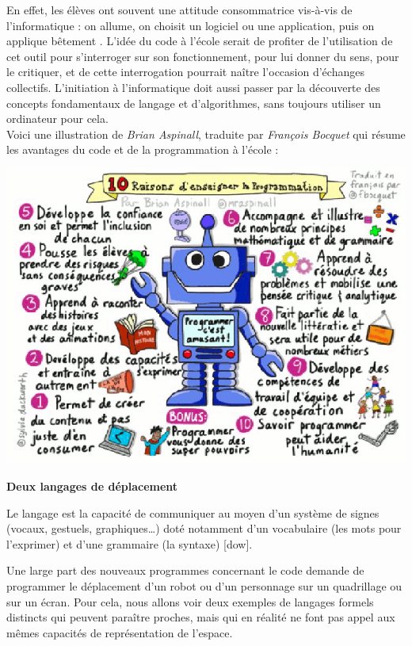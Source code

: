 En effet, les élèves ont souvent une attitude consommatrice vis-à-vis de l'informatique : on allume, on choisit un logiciel ou une application, puis on applique \og bêtement \fg{}. L'idée du code à l'école serait de profiter de l'utilisation de cet outil pour s'interroger sur son fonctionnement, pour lui donner du sens, pour le critiquer, et de cette interrogation pourrait naître l'occasion d'échanges collectifs. L'initiation à l'informatique doit aussi passer par la découverte des concepts fondamentaux de langage et d'algorithmes, sans toujours utiliser un ordinateur pour cela. \\
Voici une illustration de {\it Brian Aspinall}, traduite par {\it François Bocquet} qui résume les avantages du code et de la programmation à l'école :
\begin{center}
   \includegraphics[width=14cm]{Geometrie_did/Images/Geo6_cours_pourquoi_coder_ecole}
\end{center}

\pagebreak


{\bf\large Deux langages de déplacement} \smallskip %

Le langage est la capacité de communiquer au moyen d'un système de signes (vocaux, gestuels, graphiques\dots) doté notamment d'un vocabulaire (les mots pour l'exprimer) et d'une grammaire (la syntaxe) [dow].

Une large part des nouveaux programmes concernant le code demande de programmer le déplacement d'un robot ou d'un personnage sur un quadrillage ou sur un écran. Pour cela, nous allons voir deux exemples de langages formels distincts qui peuvent paraître proches, mais qui en réalité ne font pas appel aux mêmes capacités de représentation de l'espace.

